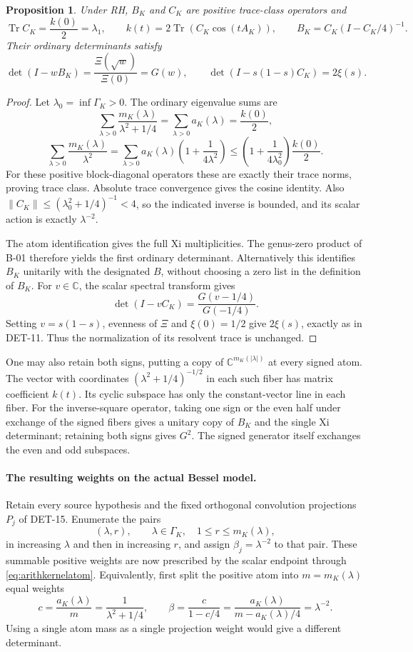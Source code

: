 \documentclass[11pt,a4paper]{article}
\newcommand{\Tr}{\operatorname{Tr}}
\newcommand{\C}{\mathbb C}
\newcommand{\fid}[1]{\textsf{#1}}
\newtheorem*{proposition}{Proposition}
\begin{document}
\begin{proposition}
Under RH, \(B_K\) and \(C_K\) are positive trace-class operators and
\[
 \Tr C_K=\frac{k(0)}2=\lambda_1,\qquad
 k(t)=2\Tr(C_K\cos(tA_K)),\qquad
 B_K=C_K(I-C_K/4)^{-1}.
\]
Their ordinary determinants satisfy
\[
 \det(I-wB_K)=\frac{\Xi(\sqrt w)}{\Xi(0)}=G(w),
 \qquad
 \det(I-s(1-s)C_K)=2\xi(s).
\]
\end{proposition}
\begin{proof}
Let \(\lambda_0=\inf\Gamma_K>0\). The ordinary eigenvalue sums are
\[
 \sum_{\lambda>0}\frac{m_K(\lambda)}{\lambda^2+1/4}
 =\sum_{\lambda>0}a_K(\lambda)=\frac{k(0)}2,
\]
\[
 \sum_{\lambda>0}\frac{m_K(\lambda)}{\lambda^2}
 =\sum_{\lambda>0}a_K(\lambda)
       \left(1+\frac1{4\lambda^2}\right)
 \le\left(1+\frac1{4\lambda_0^2}\right)\frac{k(0)}2.
\]
For these positive block-diagonal operators these are exactly their
trace norms, proving trace class. Absolute trace convergence gives
the cosine identity. Also
\(\|C_K\|\le(\lambda_0^2+1/4)^{-1}<4\), so the indicated inverse
is bounded, and its scalar action is exactly \(\lambda^{-2}\).

The atom identification gives the full Xi multiplicities. The
genus-zero product of \fid{B-01} therefore yields the first
ordinary determinant. Alternatively this identifies \(B_K\)
unitarily with the designated \(B\), without choosing a zero list
in the definition of \(B_K\).
For \(v\in\C\), the scalar spectral transform gives
\[
 \det(I-vC_K)=\frac{G(v-1/4)}{G(-1/4)}.
\]
Setting \(v=s(1-s)\), evenness of \(\Xi\) and
\(\xi(0)=1/2\) give \(2\xi(s)\), exactly as in \fid{DET-11}.
Thus the normalization of its resolvent trace is unchanged.
\end{proof}

One may also retain both signs, putting a copy of
\(\C^{m_K(|\lambda|)}\) at every signed atom. The vector with
coordinates \((\lambda^2+1/4)^{-1/2}\) in each such fiber has
matrix coefficient \(k(t)\). Its cyclic subspace has only the
constant-vector line in each fiber. For the inverse-square operator,
taking one sign or the even half under exchange of the signed fibers
gives a unitary copy of \(B_K\) and the single Xi determinant;
retaining both signs gives \(G^2\). The signed generator itself
exchanges the even and odd subspaces.

\paragraph{The resulting weights on the actual Bessel model.}
Retain every source hypothesis and the fixed orthogonal convolution
projections \(P_j\) of \fid{DET-15}. Enumerate the pairs
\[
 (\lambda,r),\qquad \lambda\in\Gamma_K,\quad
 1\le r\le m_K(\lambda),
\]
in increasing \(\lambda\) and then in increasing \(r\), and assign
\(\beta_j=\lambda^{-2}\) to that pair. These summable positive
weights are now prescribed by the scalar endpoint through
\eqref{eq:arithkernelatom}. Equivalently, first split the positive
atom into \(m=m_K(\lambda)\) equal weights
\[
 c=\frac{a_K(\lambda)}m=\frac1{\lambda^2+1/4},
 \qquad
 \beta=\frac{c}{1-c/4}
       =\frac{a_K(\lambda)}{m-a_K(\lambda)/4}
       =\lambda^{-2}.
\]
Using a single atom mass as a single projection weight would
give a different determinant.
\end{document}
